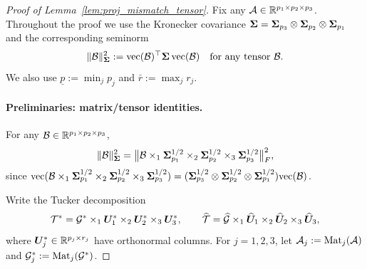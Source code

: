 \documentclass[authoryear,preprint,review,12pt]{elsarticle}
\begin{document}
{
	\begin{proof}[Proof of Lemma~\ref{lem:proj_mismatch_tensor}]
		Fix any $\mathcal{A}\in\mathbb{R}^{p_1\times p_2\times p_3}$.  Throughout the proof we use the Kronecker covariance
		$\mathbf{ \Sigma}=\mathbf{ \Sigma}_{p_3}\otimes\mathbf{ \Sigma}_{p_2}\otimes\mathbf{ \Sigma}_{p_1}$ and the corresponding seminorm
		\[
		\|\mathcal{B}\|_{\mathbf{ \Sigma}}^2:=\mathrm{vec}(\mathcal{B})^\top\mathbf{ \Sigma}\,\mathrm{vec}(\mathcal{B})
		\quad\text{for any tensor }\mathcal{B}.
		\]
		We also use $\underline p:=\min_j p_j$ and $\bar r:=\max_j r_j$.
		
		\paragraph{Preliminaries: matrix/tensor identities.}
		For any $\mathcal{B}\in\mathbb{R}^{p_1\times p_2\times p_3}$,
		\begin{equation}\label{eq:sigma_norm_equiv}
			\|\mathcal{B}\|_{\mathbf{ \Sigma}}^2
			=\big\|\mathcal{B}\times_1\mathbf{ \Sigma}_{p_1}^{1/2}\times_2\mathbf{ \Sigma}_{p_2}^{1/2}\times_3\mathbf{ \Sigma}_{p_3}^{1/2}\big\|_F^2,
		\end{equation}
		since $\mathrm{vec}(\mathcal{B}\times_1\mathbf{ \Sigma}_{p_1}^{1/2}\times_2\mathbf{ \Sigma}_{p_2}^{1/2}\times_3\mathbf{ \Sigma}_{p_3}^{1/2})
		=(\mathbf{ \Sigma}_{p_3}^{1/2}\otimes\mathbf{ \Sigma}_{p_2}^{1/2}\otimes\mathbf{ \Sigma}_{p_1}^{1/2})\mathrm{vec}(\mathcal{B})$.
		
		Write the Tucker decomposition
		\[
		\mathcal{T}^\ast=\mathcal G^\ast\times_1\boldsymbol U_1^\ast\times_2\boldsymbol U_2^\ast\times_3\boldsymbol U_3^\ast,
		\qquad
		\widehat{\mathcal{T}}=\widehat{\mathcal G}\times_1\widehat{\boldsymbol U}_1\times_2\widehat{\boldsymbol U}_2\times_3\widehat{\boldsymbol U}_3,
		\]
		where $\boldsymbol U_j^\ast\in\mathbb{R}^{p_j\times r_j}$ have orthonormal columns.  For $j=1,2,3$, let $\mathcal{A}_j:=\mathrm{Mat}_j(\mathcal{A})$
		and $\mathcal G_j^\ast:=\mathrm{Mat}_j(\mathcal G^\ast)$.
		

\end{proof}}
\end{document}
